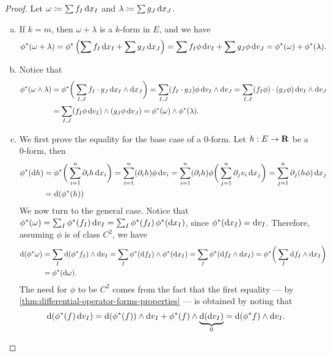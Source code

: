 \begin{proof}
Let \(\omega \coloneq \sum f_I\, \mathrm{d} x_I\) and \(\lambda \coloneq \sum g_J\,
\mathrm{d} x_J\).
\begin{enumerate}[(a)]\setlength\itemsep{0em}
\item If \(k = m\), then \(\omega + \lambda\) is a \(k\)-form in \(E\), and we
  have
  \[
    \phi^{*}(\omega + \lambda)
    = \phi^{*} \left( \sum f_I\, \mathrm{d} x_I + \sum g_J\, \mathrm{d} x_J \right)
    = \sum f_I \phi\, \mathrm{d} v_I + \sum g_J \phi\, \mathrm{d} v_J
    = \phi^{*}(\omega) + \phi^{*}(\lambda).
  \]
\item Notice that
  \begin{align*}
    \phi^{*}(\omega \wedge \lambda)
    &= \phi^{*} \bigg(
      \sum_{I, J} f_I \cdot g_J\, \mathrm{d} x_I \wedge \mathrm{d} x_J
    \bigg)
    = \sum_{I, J} (f_I \cdot g_J) \phi\, \mathrm{d} v_I \wedge \mathrm{d} v_J
    = \sum_{I, J} (f_I \phi) \cdot (g_J \phi)\, \mathrm{d} v_I \wedge \mathrm{d} v_J \\
    &= \sum_{I, J} (f_I \phi\, \mathrm{d} v_I) \wedge (g_J \phi\, \mathrm{d} v_J)
    = \phi^{*}(\omega) \wedge \phi^{*}(\lambda).
  \end{align*}
\item We first prove the equality for the base case of a \(0\)-form. Let \(h: E
  \to \mathbf{R}\) be a \(0\)-form, then
  \begin{align*}
    \phi^{*} (\mathrm{d} h)
    &= \phi^{*} \bigg( \sum_{i=1}^n \partial_i h\, \mathrm{d} x_i \bigg)
    = \sum_{i=1}^n (\partial_i h) \phi\, \mathrm{d} v_i
    = \sum_{i=1}^n (\partial_i h) \phi
      \bigg( \sum_{j=1}^{n} \partial_j v_i\, \mathrm{d} x_j \bigg)
    = \sum_{j=1}^n \partial_j (h \phi)\, \mathrm{d} x_j \\
    &= \mathrm{d} (\phi^{*}(h))
  \end{align*}
  We now turn to the general case. Notice that \(\phi^{*}(\omega) = \sum_I
  \phi^{*}(f_I)\, \mathrm{d} v_I = \sum_I \phi^{*}(f_I)\, \phi^{*}(\mathrm{d} x_{I})\),
  since \(\phi^{*} (\mathrm{d} x_I) = \mathrm{d} v_I\). Therefore, assuming \(\phi\) is of
  class \(C^2\), we have
  \begin{align*}
    \mathrm{d} (\phi^{*} \omega)
    &= \sum_I \mathrm{d}(\phi^{*} f_{I}) \wedge \mathrm{d} v_{I}
    = \sum_I \phi^{*}(\mathrm{d} f_I) \wedge \phi^{*} (\mathrm{d} x_{I})
    = \sum_I \phi^{*}(\mathrm{d} f_I \wedge \mathrm{d} x_I)
    = \phi^{*} \bigg( \sum_I \mathrm{d} f_I \wedge \mathrm{d} x_I \bigg) \\
    &= \phi^{*}(\mathrm{d} \omega).
  \end{align*}
  The need for \(\phi\) to be \(C^2\) comes from the fact that the first
  equality --- by \cref{thm:differential-operator-forms-properties} --- is
  obtained by noting that
  \[
    \mathrm{d} (\phi^{*}(f)\, \mathrm{d} v_I)
    = \mathrm{d} (\phi^{*}(f)) \wedge \mathrm{d} v_I
      + \phi^{*}(f) \wedge \underbrace{\mathrm{d}(\mathrm{d} v_I)}_{0}
    = \mathrm{d} (\phi^{*}f) \wedge \mathrm{d} v_I.
  \]
\end{enumerate}
\end{proof}

